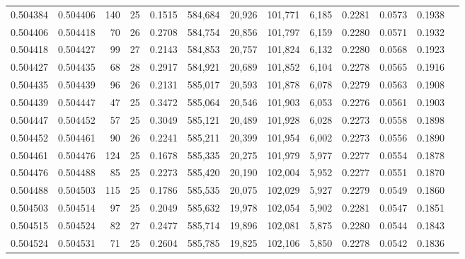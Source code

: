 \begin{tabular}{rrrrrrrrrrrrr}
0.504384 & 0.504406 & 140 &  25 &                                     0.1515 & 584,684 &  20,926 & 101,771 &   6,185 & 0.2281 & 0.0573 & 0.1938 \\
0.504406 & 0.504418 &  70 &  26 &                                     0.2708 & 584,754 &  20,856 & 101,797 &   6,159 & 0.2280 & 0.0571 & 0.1932 \\
0.504418 & 0.504427 &  99 &  27 &                                     0.2143 & 584,853 &  20,757 & 101,824 &   6,132 & 0.2280 & 0.0568 & 0.1923 \\
0.504427 & 0.504435 &  68 &  28 &                                     0.2917 & 584,921 &  20,689 & 101,852 &   6,104 & 0.2278 & 0.0565 & 0.1916 \\
0.504435 & 0.504439 &  96 &  26 &                                     0.2131 & 585,017 &  20,593 & 101,878 &   6,078 & 0.2279 & 0.0563 & 0.1908 \\
0.504439 & 0.504447 &  47 &  25 &                                     0.3472 & 585,064 &  20,546 & 101,903 &   6,053 & 0.2276 & 0.0561 & 0.1903 \\
0.504447 & 0.504452 &  57 &  25 &                                     0.3049 & 585,121 &  20,489 & 101,928 &   6,028 & 0.2273 & 0.0558 & 0.1898 \\
0.504452 & 0.504461 &  90 &  26 &                                     0.2241 & 585,211 &  20,399 & 101,954 &   6,002 & 0.2273 & 0.0556 & 0.1890 \\
0.504461 & 0.504476 & 124 &  25 &                                     0.1678 & 585,335 &  20,275 & 101,979 &   5,977 & 0.2277 & 0.0554 & 0.1878 \\
0.504476 & 0.504488 &  85 &  25 &                                     0.2273 & 585,420 &  20,190 & 102,004 &   5,952 & 0.2277 & 0.0551 & 0.1870 \\
0.504488 & 0.504503 & 115 &  25 &                                     0.1786 & 585,535 &  20,075 & 102,029 &   5,927 & 0.2279 & 0.0549 & 0.1860 \\
0.504503 & 0.504514 &  97 &  25 &                                     0.2049 & 585,632 &  19,978 & 102,054 &   5,902 & 0.2281 & 0.0547 & 0.1851 \\
0.504515 & 0.504524 &  82 &  27 &                                     0.2477 & 585,714 &  19,896 & 102,081 &   5,875 & 0.2280 & 0.0544 & 0.1843 \\
0.504524 & 0.504531 &  71 &  25 &                                     0.2604 & 585,785 &  19,825 & 102,106 &   5,850 & 0.2278 & 0.0542 & 0.1836 \\

\end{tabular}
